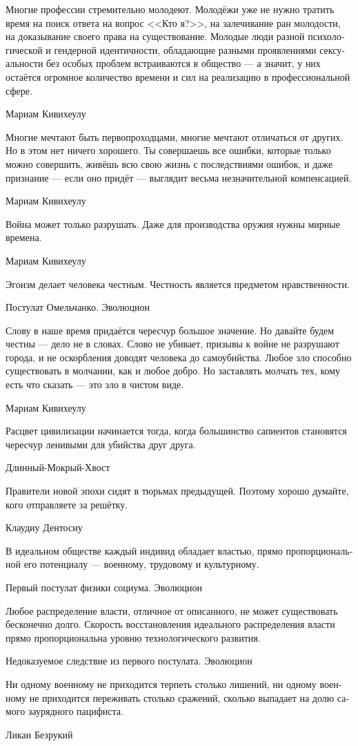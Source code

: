 \documentclass[a4paper,12pt,fleqn]{book}\usepackage{polyglossia}\setdefaultlanguage[babelshorthands=true]{russian}\setotherlanguage{english}\defaultfontfeatures{Ligatures=TeX,Mapping=tex-text}\usepackage{xcolor}\newcommand{\ml}[3]{#2}
\begin{document}
{\epigraph
{Многие профессии стремительно молодеют.
Молодёжи уже не нужно тратить время на поиск ответа на вопрос <<Кто я?>>, на залечивание ран молодости, на доказывание своего права на существование.
Молодые люди разной психологической и гендерной идентичности, обладающие разными проявлениями сексуальности без особых проблем встраиваются в общество --- а значит, у них остаётся огромное количество времени и сил на реализацию в профессиональной сфере.}
{Мариам Кивихеулу}

\epigraph
{Многие мечтают быть первопроходцами, многие мечтают отличаться от других.
Но в этом нет ничего хорошего.
Ты совершаешь все ошибки, которые только можно совершить, живёшь всю свою жизнь с последствиями ошибок, и даже признание --- если оно придёт --- выглядит весьма незначительной компенсацией.}
{Мариам Кивихеулу}

\epigraph
{Война может только разрушать.
Даже для производства оружия нужны мирные времена.}
{Мариам Кивихеулу}

\epigraph
{Эгоизм делает человека честным.
Честность является предметом нравственности.}
{Постулат Омельчанко.
Эволюцион}

\epigraph
{Слову в наше время придаётся чересчур большое значение.
Но давайте будем честны --- дело не в словах.
Слово не убивает, призывы к войне не разрушают города,  и не оскорбления доводят человека до самоубийства.
Любое зло способно существовать в молчании, как и любое добро.
Но заставлять молчать тех, кому есть что сказать --- это зло в чистом виде.}
{Мариам Кивихеулу}

\epigraph
{Расцвет цивилизации начинается тогда, когда большинство сапиентов становятся чересчур ленивыми для убийства друг друга.}
{Длинный-Мокрый-Хвост}

\epigraph
{Правители новой эпохи сидят в тюрьмах предыдущей.
Поэтому хорошо думайте, кого отправляете за решётку.}
{Клаудиу Дентосиу}

\epigraph
{В идеальном обществе каждый индивид обладает властью, прямо пропорциональной его потенциалу --- военному, трудовому и культурному.}
{Первый постулат физики социума. Эволюцион}

\epigraph
{Любое распределение власти, отличное от описанного, не может существовать бесконечно долго.
Скорость восстановления идеального распределения власти прямо пропорциональна уровню технологического развития.}
{Недоказуемое следствие из первого постулата. Эволюцион}

\epigraph
{Ни одному военному не приходится терпеть столько лишений, ни одному военному не приходится переживать столько сражений, сколько выпадает на долю самого заурядного пацифиста.}
{Ликан Безрукий}

}
\end{document}
